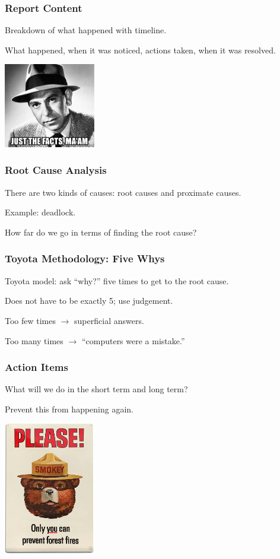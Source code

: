 \begin{frame}
\frametitle{Report Content}

Breakdown of what happened with timeline.

What happened, when it was noticed, actions taken, when it was resolved.

\begin{center}
	\includegraphics[width=0.3\textwidth]{images/just-the-facts.jpg}
\end{center}


\end{frame}


\begin{frame}
\frametitle{Root Cause Analysis}

There are two kinds of causes: root causes and proximate causes.

Example: deadlock.

How far do we go in terms of finding the root cause?

\end{frame}


\begin{frame}
\frametitle{Toyota Methodology: Five Whys}

Toyota model: ask ``why?'' five times to get to the root cause.

Does not have to be exactly 5; use judgement.

Too few times $\rightarrow$ superficial answers.

Too many times $\rightarrow$ ``computers were a mistake.''

\end{frame}


\begin{frame}
\frametitle{Action Items}

What will we do in the short term and long term?

Prevent this from happening again.

\begin{center}
	\includegraphics[width=0.3\textwidth]{images/smokeybear.jpg}
\end{center}

\end{frame}



